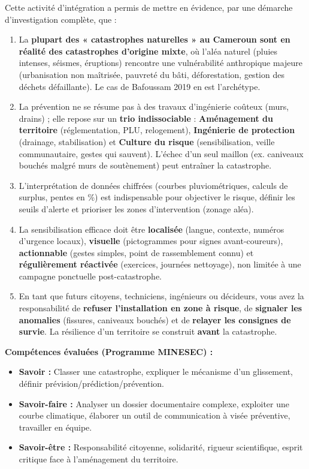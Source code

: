 \documentclass[11pt]{article}
\newcommand{\cle}[1]{{\popxbold\color{popdark}#1}}
\newcounter{popsec}
\newcounter{popsub}
\newcommand{\courssub}[1]{%
  \stepcounter{popsub}%
  \par\vspace{9pt}\noindent{\popxbold\fontsize{11.5}{13}\selectfont\color{popink}{\color{poporange}\thepopsec.\thepopsub}\hspace{6pt}#1}\par\nopagebreak\vspace{4pt}
}
\begin{document}
\courssub{Bilan de l'activité}
Cette activité d'intégration a permis de mettre en évidence, par une démarche d'investigation complète, que :
\begin{enumerate}
    \item La \textbf{plupart des « catastrophes naturelles » au Cameroun sont en réalité des catastrophes d'origine mixte}, où l'aléa naturel (pluies intenses, séismes, éruptions) rencontre une vulnérabilité anthropique majeure (urbanisation non maîtrisée, pauvreté du bâti, déforestation, gestion des déchets défaillante). Le cas de Bafoussam 2019 en est l'archétype.
    \item La \cle{prévention} ne se résume pas à des travaux d'ingénierie coûteux (murs, drains) ; elle repose sur un \textbf{trio indissociable} : \textbf{Aménagement du territoire} (réglementation, PLU, relogement), \textbf{Ingénierie de protection} (drainage, stabilisation) et \textbf{Culture du risque} (sensibilisation, veille communautaire, gestes qui sauvent). L'échec d'un seul maillon (ex. caniveaux bouchés malgré murs de soutènement) peut entraîner la catastrophe.
    \item L'\cle{interprétation de données chiffrées} (courbes pluviométriques, calculs de surplus, pentes en \%) est indispensable pour objectiver le risque, définir les seuils d'alerte et prioriser les zones d'intervention (zonage aléa).
    \item La \cle{sensibilisation} efficace doit être \textbf{localisée} (langue, contexte, numéros d'urgence locaux), \textbf{visuelle} (pictogrammes pour signes avant-coureurs), \textbf{actionnable} (gestes simples, point de rassemblement connu) et \textbf{régulièrement réactivée} (exercices, journées nettoyage), non limitée à une campagne ponctuelle post-catastrophe.
    \item En tant que futurs citoyens, techniciens, ingénieurs ou décideurs, vous avez la responsabilité de \textbf{refuser l'installation en zone à risque}, de \textbf{signaler les anomalies} (fissures, caniveaux bouchés) et de \textbf{relayer les consignes de survie}. La résilience d'un territoire se construit \textbf{avant} la catastrophe.
\end{enumerate}
\textbf{Compétences évaluées (Programme MINESEC) :}
\begin{itemize}
    \item \textbf{Savoir :} Classer une catastrophe, expliquer le mécanisme d'un glissement, définir prévision/prédiction/prévention.
    \item \textbf{Savoir-faire :} Analyser un dossier documentaire complexe, exploiter une courbe climatique, élaborer un outil de communication à visée préventive, travailler en équipe.
    \item \textbf{Savoir-être :} Responsabilité citoyenne, solidarité, rigueur scientifique, esprit critique face à l'aménagement du territoire.
\end{itemize}
\end{document}

